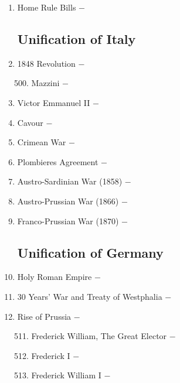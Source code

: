 \documentclass[12pt]{article}
\begin{document}
\begin{enumerate}
\item Home Rule Bills $-$ 

\subsection{Unification of Italy}

\item 1848 Revolution $-$ 

\begin{enumerate}[label=\arabic{*}.]
\setcounter{enumii}{499}

\item Mazzini $-$ 

\end{enumerate}
\setcounter{enumi}{500}

\item Victor Emmanuel II $-$

\item Cavour $-$ 

\item Crimean War $-$ 

\item Plombieres Agreement $-$ 

\item Austro-Sardinian War (1858) $-$ 

\item Austro-Prussian War (1866) $-$ 

\item Franco-Prussian War (1870) $-$ 

\subsection{Unification of Germany}

\item Holy Roman Empire $-$ 

\item 30 Years' War and Treaty of Westphalia $-$ 

\item Rise of Prussia $-$ 

\begin{enumerate}[label=\arabic{*}.]
\setcounter{enumii}{510}

\item Frederick William, The Great Elector $-$ 

\item Frederick I $-$ 

\item Frederick William I $-$ 


\end{enumerate}
\end{enumerate}
\end{document}
